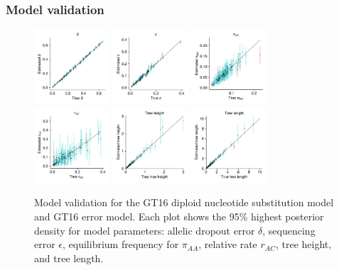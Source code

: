 \documentclass[10pt,letterpaper,table]{article}
\theoremstyle{definition}
\begin{document}
\subsubsection*{Model validation}
\begin{figure}[!h]
    \centering
    \includegraphics[width=0.25\textwidth]{figs_plos/gt16_EM_delta.pdf}
    \includegraphics[width=0.25\textwidth]{figs_plos/gt16_EM_epsilon.pdf}
    \includegraphics[width=0.25\textwidth]{figs_plos/gt16_EM_pi_0.pdf}
    \includegraphics[width=0.25\textwidth]{figs_plos/gt16_EM_rates_ac.pdf}
    \includegraphics[width=0.25\textwidth]{figs_plos/gt16_EM_treeheight.pdf}
    \includegraphics[width=0.25\textwidth]{figs_plos/gt16_EM_treelength.pdf}
    \caption{Model validation for the GT16 diploid nucleotide substitution model and GT16 error model. Each plot shows the 95\% highest posterior density for model parameters: allelic dropout error $\delta$, sequencing error $\epsilon$, equilibrium frequency for $\pi_{AA}$, relative rate $r_{AC}$, tree height, and tree length. }
    \label{fig_validation}
\end{figure}
\end{document}

